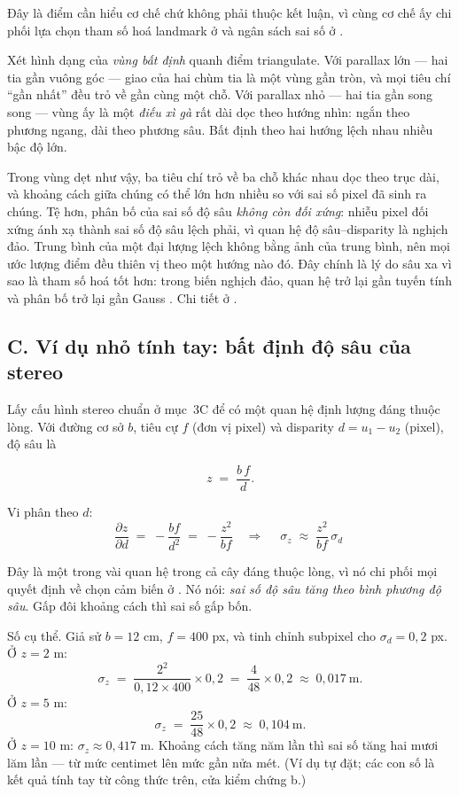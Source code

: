 \documentclass[../../vslam.tex]{subfiles}
\begin{document}
Đây là điểm cần hiểu cơ chế chứ không phải thuộc kết luận, vì cùng cơ chế ấy chi phối lựa chọn tham số hoá landmark ở  và ngân sách sai số ở .

Xét hình dạng của \emph{vùng bất định} quanh điểm triangulate. Với parallax lớn --- hai tia gần vuông góc --- giao của hai chùm tia là một vùng gần tròn, và mọi tiêu chí ``gần nhất'' đều trỏ về gần cùng một chỗ. Với parallax nhỏ --- hai tia gần song song --- vùng ấy là một \emph{điếu xì gà} rất dài dọc theo hướng nhìn: ngắn theo phương ngang, dài theo phương sâu. Bất định theo hai hướng lệch nhau nhiều bậc độ lớn.

Trong vùng dẹt như vậy, ba tiêu chí trỏ về ba chỗ khác nhau dọc theo trục dài, và khoảng cách giữa chúng có thể lớn hơn nhiều so với sai số pixel đã sinh ra chúng. Tệ hơn, phân bố của sai số độ sâu \emph{không còn đối xứng}: nhiễu pixel đối xứng ánh xạ thành sai số độ sâu lệch phải, vì quan hệ độ sâu--disparity là nghịch đảo. Trung bình của một đại lượng lệch không bằng ảnh của trung bình, nên mọi ước lượng điểm đều thiên vị theo một hướng nào đó. Đây chính là lý do sâu xa vì sao  là tham số hoá tốt hơn: trong biến nghịch đảo, quan hệ trở lại gần tuyến tính và phân bố trở lại gần Gauss \cite{civera2008inversedepth}. Chi tiết ở .

\subsection{C. Ví dụ nhỏ tính tay: bất định độ sâu của stereo}

Lấy cấu hình stereo chuẩn ở mục~3C để có một quan hệ định lượng đáng thuộc lòng. Với đường cơ sở \(b\), tiêu cự \(f\) (đơn vị pixel) và disparity \(d = u_1 - u_2\) (pixel), độ sâu là

\begin{equation}
z \;=\; \frac{b\,f}{d} .
\label{eq:a01-depth}
\end{equation}

Vi phân theo \(d\):
\[
\frac{\partial z}{\partial d} \;=\; -\frac{b f}{d^2} \;=\; -\frac{z^2}{b f}
\quad\Longrightarrow\quad
\boxed{\;\sigma_z \;\approx\; \frac{z^2}{b f}\,\sigma_d\;}
\]

Đây là một trong vài quan hệ trong cả cây đáng thuộc lòng, vì nó chi phối mọi quyết định về chọn cảm biến ở . Nó nói: \emph{sai số độ sâu tăng theo bình phương độ sâu}. Gấp đôi khoảng cách thì sai số gấp bốn.

Số cụ thể. Giả sử \(b = 12\) cm, \(f = 400\) px, và tinh chỉnh subpixel cho \(\sigma_d = 0{,}2\) px. Ở \(z = 2\) m:
\[
\sigma_z \;=\; \frac{2^2}{0{,}12 \times 400}\times 0{,}2 \;=\; \frac{4}{48}\times 0{,}2 \;\approx\; 0{,}017\ \text{m} .
\]
Ở \(z = 5\) m:
\[
\sigma_z \;=\; \frac{25}{48}\times 0{,}2 \;\approx\; 0{,}104\ \text{m} .
\]
Ở \(z = 10\) m: \(\sigma_z \approx 0{,}417\) m. Khoảng cách tăng năm lần thì sai số tăng hai mươi lăm lần --- từ mức centimet lên mức gần nửa mét. (Ví dụ tự đặt; các con số là kết quả tính tay từ công thức trên, cửa kiểm chứng b.)
\end{document}
